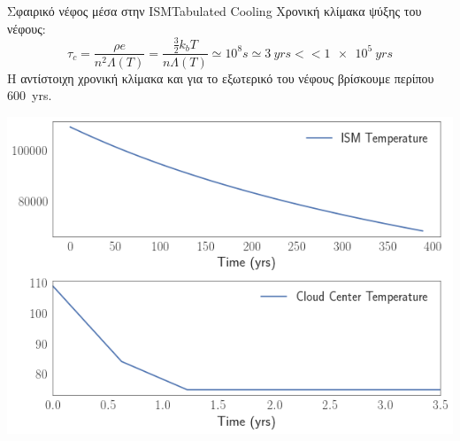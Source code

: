 \documentclass{beamer}
\begin{document}
\begin{frame}{Σφαιρικό νέφος μέσα στην ISM}{Tabulated Cooling}
Χρονική κλίμακα ψύξης του νέφους:
	\begin{equation}
	\tau _c =\frac{ \rho e} {n^2 \Lambda (T)}=
	\frac{ \frac{3}{2}k_b T} {n \Lambda (T)} 
	\simeq 10^8\si{s}\simeq \SI{3}{yrs} << \SI{1e5}{yrs}
	\end{equation}
	H αντίστοιχη χρονική κλίμακα και για το εξωτερικό του νέφους βρίσκουμε περίπου \SI{600}{yrs}. 
	
\begin{center}
	\includegraphics[width=0.6\linewidth]{../Document/DataImages/TabCoolingTMPcenterISM}
\end{center}
\end{frame}
\end{document}
